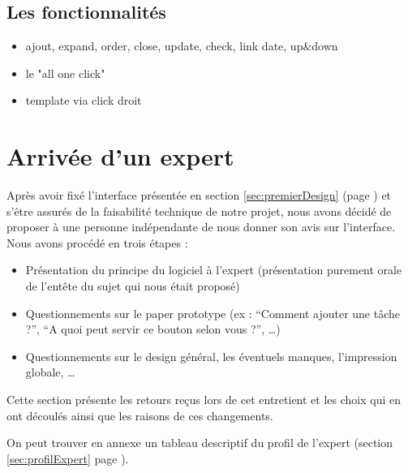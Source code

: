 \documentclass[11pt]{article}
\begin{document}


\subsection{Les fonctionnalités}
\begin{itemize}
\item ajout, expand, order, close, update, check, link date, up\&down
\item le "all one click"
\item template via click droit
\end{itemize}



\section{Arrivée d'un expert}

Après avoir fixé l'interface présentée en section
\ref{sec:premierDesign} (page \pageref{sec:premierDesign}) et s'être
assurés de la faisabilité technique de notre projet, nous avons décidé
de proposer à une personne indépendante de nous donner son avis sur
l'interface. Nous avons procédé en trois étapes :

\begin{itemize}
\item Présentation du principe du logiciel à l'expert (présentation
  purement orale de l'entête du sujet qui nous était proposé)
\item Questionnements sur le paper prototype (ex : ``Comment ajouter
  une tâche ?'', ``A quoi peut servir ce bouton selon vous ?'', \dots)
\item Questionnements sur le design général, les éventuels manques,
  l'impression globale, \dots
\end{itemize}

Cette section présente les retours reçus lors de cet entretient et les
choix qui en ont découlés ainsi que les raisons de ces changements.

On peut trouver en annexe un tableau descriptif du profil de l'expert
(section \ref{sec:profilExpert} page \pageref{sec:profilExpert}).
\end{document}
